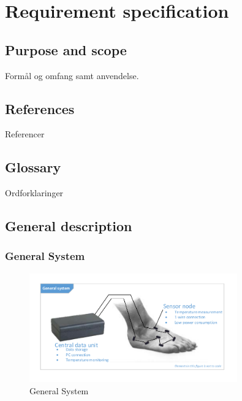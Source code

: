 



\chapter{Requirement specification}

\section{Purpose and scope}
Formål og omfang samt anvendelse.

\section{References}
Referencer

\section{Glossary}
Ordforklaringer

\section{General description}

\subsection{General System}
\begin{figure}[H]
	\centering
	\includegraphics[width=0.8\textwidth]{billeder/GeneralSystem}
	\caption{General System}
\end{figure}

